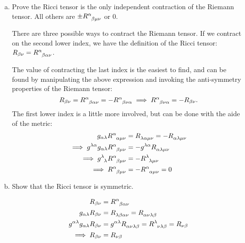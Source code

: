 \documentclass[gr-notes.tex]{subfiles}
\begin{document}
\begin{enumerate}[(a)]
\item Prove the Ricci tensor is the only independent contraction of the Riemann tensor. All others are $\pm \tensor{R}{^\alpha_{\beta\mu\nu}}$ or $0$.

There are three possible ways to contract the Riemann tensor. If we contract on the second lower index, we have the definition of the Ricci tensor: $R_{\beta\nu} = \tensor{R}{^\alpha_{\beta\alpha\nu}}$.

The value of contracting the last index is the easiest to find, and can be found by manipulating the above expression and invoking the anti-symmetry properties of the Riemann tensor:
%
\begin{displaymath}
  R_{\beta\nu} =
  \tensor{R}{^\alpha_{\beta\alpha\nu}} =
 -\tensor{R}{^\alpha_{\beta\nu\alpha}}
  \implies
  \tensor{R}{^\alpha_{\beta\nu\alpha}} =
 -R_{\beta\nu}.
\end{displaymath}
%
The first lower index is a little more involved, but can be done with the aide of the metric:
%
\begin{align*}
  g_{\alpha\lambda} \tensor{R}{^\alpha_{\alpha\mu\nu}} &=
  \tensor{R}{_{\lambda\alpha\mu\nu}} =
 -\tensor{R}{_{\alpha\lambda\mu\nu}}
  \\ \implies
  g^{\lambda\alpha} g_{\alpha\lambda} \tensor{R}{^\alpha_{\beta\mu\nu}} &=
 -g^{\lambda\alpha} \tensor{R}{_{\alpha\lambda\mu\nu}}
  \\ \implies
  \tensor{g}{^\lambda_\lambda} \tensor{R}{^\alpha_{\beta\mu\nu}} &=
 -\tensor{R}{^\lambda_{\lambda\mu\nu}}
  \\ \implies
  \tensor{R}{^\alpha_{\beta\mu\nu}} &=
 -\tensor{R}{^\alpha_{\alpha\mu\nu}} =
  0
\end{align*}

\item Show that the Ricci tensor is symmetric.

\begin{align*}
  R_{\beta\nu} &=
  \tensor{R}{^\alpha_{\beta\alpha\nu}}
  \\
  g_{\alpha\lambda} R_{\beta\nu} &=
  \tensor{R}{_{\lambda\beta\alpha\nu}} =
  \tensor{R}{_{\alpha\nu\lambda\beta}}
  \\
  g^{\alpha\lambda} g_{\alpha\lambda} R_{\beta\nu} &=
  g^{\alpha\lambda} \tensor{R}{_{\alpha\nu\lambda\beta}} =
  \tensor{R}{^\lambda_{\nu\lambda\beta}} = R_{\nu\beta}
  \\ \implies
  R_{\beta\nu} &= R_{\nu\beta}
\end{align*}


\end{enumerate}
\end{document}
